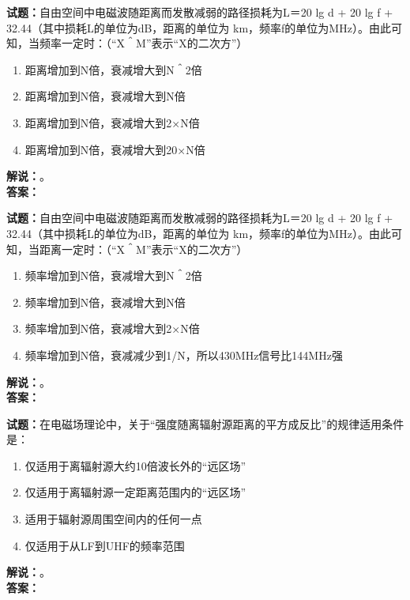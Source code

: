 \documentclass{ctexbook}
\begin{document}
\bigskip




\noindent\textbf{试题：}自由空间中电磁波随距离而发散减弱的路径损耗为L＝20 lg d + 20 lg f + 32.44（其中损耗L的单位为dB，距离的单位为 km，频率f的单位为\unit{\MHz}）。由此可知，当频率一定时：（“X＾M”表示“X的二次方”）
\begin{enumerate}[leftmargin=3em]
\item 距离增加到N倍，衰减增大到N＾2倍
\item 距离增加到N倍，衰减增大到N倍
\item 距离增加到N倍，衰减增大到2×N倍
\item 距离增加到N倍，衰减增大到20×N倍
\end{enumerate}
\noindent\textbf{解说：}\textbf{}。\\\noindent\textbf{答案：}

\bigskip




\noindent\textbf{试题：}自由空间中电磁波随距离而发散减弱的路径损耗为L＝20 lg d + 20 lg f + 32.44（其中损耗L的单位为dB，距离的单位为 km，频率f的单位为\unit{\MHz}）。由此可知，当距离一定时：（“X＾M”表示“X的二次方”）
\begin{enumerate}[leftmargin=3em]
\item 频率增加到N倍，衰减增大到N＾2倍
\item 频率增加到N倍，衰减增大到N倍
\item 频率增加到N倍，衰减增大到2×N倍
\item 频率增加到N倍，衰减减少到1/N，所以430\unit{\MHz}信号比144\unit{\MHz}强
\end{enumerate}
\noindent\textbf{解说：}\textbf{}。\\\noindent\textbf{答案：}

\bigskip




\noindent\textbf{试题：}在电磁场理论中，关于“强度随离辐射源距离的平方成反比”的规律适用条件是：
\begin{enumerate}[leftmargin=3em]
\item 仅适用于离辐射源大约10倍波长外的“远区场”
\item 仅适用于离辐射源一定距离范围内的“远区场”
\item 适用于辐射源周围空间内的任何一点
\item 仅适用于从LF到UHF的频率范围
\end{enumerate}
\noindent\textbf{解说：}\textbf{}。\\\noindent\textbf{答案：}
\end{document}
